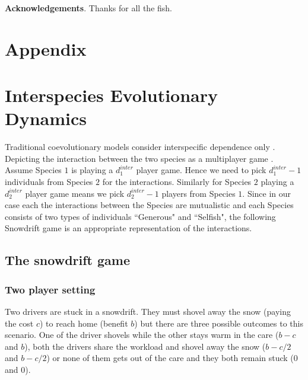 \documentclass[12pt]{article}
\begin{document}
\textbf{Acknowledgements}. Thanks for all the fish.



%



\appendix{}
\section*{Appendix}

\section*{Interspecies Evolutionary Dynamics}

Traditional coevolutionary models consider interspecific dependence only \citep{roughgarden:TPB:1976,roughgarden:book:1983}.
Depicting the interaction between the two species as a multiplayer game \citep{gokhale:PNAS:2010}.
Assume Species $1$ is playing a $d_1^{inter}$ player game.
Hence we need to pick $d_1^{inter}-1$ individuals from Species $2$ for the interactions.
Similarly for Species $2$ playing a $d_2^{inter}$ player game means we pick $d_2^{inter}-1$ players from Species $1$.
Since in our case each the interactions between the Species are mutualistic and each Species consists of two types of individuals ``Generous" and ``Selfish", the following Snowdrift game is an appropriate representation of the interactions.





\subsection*{The snowdrift game}
\label{appA}
\subsubsection*{Two player setting}
Two drivers are stuck in a snowdrift.
They must shovel away the snow (paying the cost $c$) to reach home (benefit $b$) but there are three possible outcomes to this scenario.
One of the driver shovels while the other stays warm in the care ($b-c$ and $b$), both the drivers share the workload and shovel away the snow ($b-c/2$ and $b-c/2$) or none of them gets out of the care and they both remain stuck ($0$ and $0$).
\end{document}
